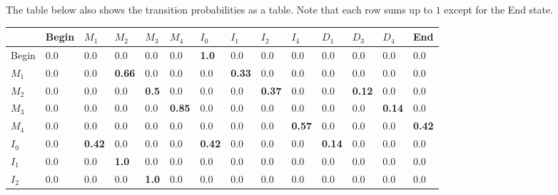 \documentclass[12pt]{article}
\begin{document}
The table below also shows the transition probabilities as a table. Note that each row sums up to $1$ except for the End state.
\begin{table}[H]
\begin{tabular}{|l|l|l|l|l|l|l|l|l|l|l|l|l|l|}
\hline
      & Begin & $M_1$            & $M_2$            & $M_3$           & $M_4$           & $I_0$            & $I_1$            & $I_2$            & $I_4$            & $D_1$            & $D_3$            & $D_4$            & End           \\ \hline
Begin & 0.0   & 0.0           & 0.0           & 0.0          & 0.0           & \textbf{1.0}  & 0.0           & 0.0           & 0.0           & 0.0           & 0.0           & 0.0           & 0.0           \\ \hline
$M_1$    & 0.0   & 0.0           & \textbf{0.66} & 0.0          & 0.0           & 0.0           & \textbf{0.33} & 0.0           & 0.0           & 0.0           & 0.0           & 0.0           & 0.0           \\ \hline
$M_2$    & 0.0   & 0.0           & 0.0           & \textbf{0.5} & 0.0           & 0.0           & 0.0           & \textbf{0.37} & 0.0           & 0.0           & \textbf{0.12} & 0.0           & 0.0           \\ \hline
$M_3$    & 0.0   & 0.0           & 0.0           & 0.0          & \textbf{0.85} & 0.0           & 0.0           & 0.0           & 0.0           & 0.0           & 0.0           & \textbf{0.14} & 0.0           \\ \hline
$M_4$    & 0.0   & 0.0           & 0.0           & 0.0          & 0.0           & 0.0           & 0.0           & 0.0           & \textbf{0.57} & 0.0           & 0.0           & 0.0           & \textbf{0.42} \\ \hline
$I_0$    & 0.0   & \textbf{0.42} & 0.0           & 0.0          & 0.0           & \textbf{0.42} & 0.0           & 0.0           & 0.0           & \textbf{0.14} & 0.0           & 0.0           & 0.0           \\ \hline
$I_1$    & 0.0   & 0.0           & \textbf{1.0}           & 0.0          & 0.0           & 0.0           & 0.0           & 0.0           & 0.0           & 0.0           & 0.0           & 0.0           & 0.0           \\ \hline
$I_2$    & 0.0   & 0.0           & 0.0           & \textbf{1.0}          & 0.0           & 0.0           & 0.0           & 0.0           & 0.0           & 0.0           & 0.0           & 0.0           & 0.0           \\ \hline

\end{tabular}
\end{table}
\end{document}
